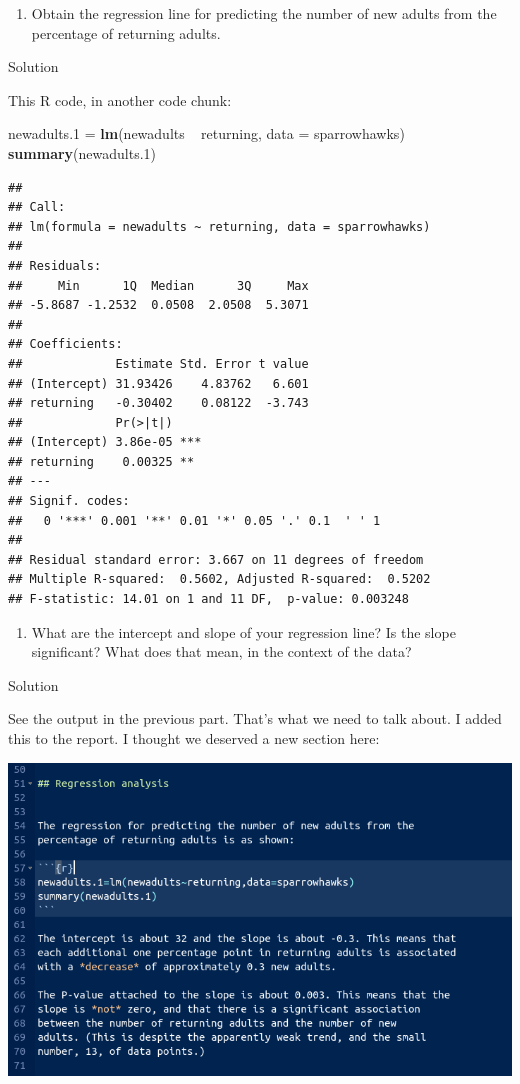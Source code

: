\documentclass[]{tufte-book}
\newenvironment{Shaded}{}{}
\newcommand{\DataTypeTok}[1]{\textcolor[rgb]{0.56,0.13,0.00}{#1}}
\newcommand{\FloatTok}[1]{\textcolor[rgb]{0.25,0.63,0.44}{#1}}
\newcommand{\KeywordTok}[1]{\textcolor[rgb]{0.00,0.44,0.13}{\textbf{#1}}}
\newcommand{\NormalTok}[1]{#1}
\newcommand{\OperatorTok}[1]{\textcolor[rgb]{0.40,0.40,0.40}{#1}}
\newcommand{\StringTok}[1]{\textcolor[rgb]{0.25,0.44,0.63}{#1}}
\providecommand{\tightlist}{%
  \setlength{\itemsep}{0pt}\setlength{\parskip}{0pt}}
\theoremstyle{definition}
\theoremstyle{definition}
\theoremstyle{definition}
\theoremstyle{remark}
\begin{document}
\begin{enumerate}
\def\labelenumi{(\alph{enumi})}
\setcounter{enumi}{4}
\tightlist
\item
  Obtain the regression line for predicting the number of new adults
  from the percentage of returning adults.
\end{enumerate}

Solution

This R code, in another code chunk:

\begin{Shaded}
\begin{Highlighting}[]
\NormalTok{newadults}\FloatTok{.1}\NormalTok{ =}\StringTok{ }\KeywordTok{lm}\NormalTok{(newadults }\OperatorTok{~}\StringTok{ }\NormalTok{returning, }\DataTypeTok{data =}\NormalTok{ sparrowhawks)}
\KeywordTok{summary}\NormalTok{(newadults}\FloatTok{.1}\NormalTok{)}
\end{Highlighting}
\end{Shaded}

\begin{verbatim}
## 
## Call:
## lm(formula = newadults ~ returning, data = sparrowhawks)
## 
## Residuals:
##     Min      1Q  Median      3Q     Max 
## -5.8687 -1.2532  0.0508  2.0508  5.3071 
## 
## Coefficients:
##             Estimate Std. Error t value
## (Intercept) 31.93426    4.83762   6.601
## returning   -0.30402    0.08122  -3.743
##             Pr(>|t|)    
## (Intercept) 3.86e-05 ***
## returning    0.00325 ** 
## ---
## Signif. codes:  
##   0 '***' 0.001 '**' 0.01 '*' 0.05 '.' 0.1  ' ' 1
## 
## Residual standard error: 3.667 on 11 degrees of freedom
## Multiple R-squared:  0.5602, Adjusted R-squared:  0.5202 
## F-statistic: 14.01 on 1 and 11 DF,  p-value: 0.003248
\end{verbatim}

\begin{enumerate}
\def\labelenumi{(\alph{enumi})}
\setcounter{enumi}{5}
\tightlist
\item
  What are the intercept and slope of your regression line? Is the slope
  significant? What does that mean, in the context of the data?
\end{enumerate}

Solution

See the output in the previous part. That's what we need to talk about.
I added this to the report. I thought we deserved a new section here:

\includegraphics{sh6.png}
\end{document}
